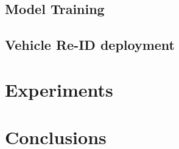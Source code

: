 \documentclass[10pt,twocolumn,letterpaper]{article}
\begin{document}
\subsection{Model Training}

\subsection{Vehicle Re-ID deployment}

\section{Experiments}

\section{Conclusions}

{\small


}
\end{document}
